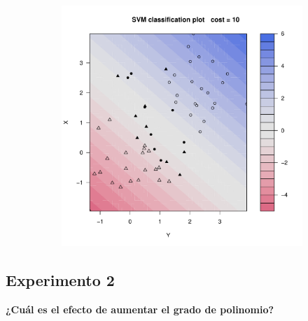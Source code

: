 \begin{figure}[H]
\begin{subfigure}{0.24\linewidth}
		\caption{}
	\end{subfigure}
	\begin{subfigure}{0.24\linewidth}
		\includegraphics[width=1\linewidth]{Graphics/Problema_01/Experiment_01_4.pdf}
		\caption{}
	\end{subfigure}
	\caption{}
\end{figure}

\subsection*{Experimento 2}

\textbf{¿Cuál es el efecto de aumentar el grado de polinomio?}

